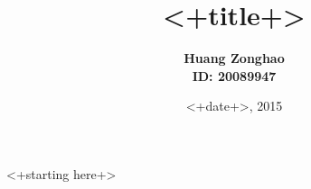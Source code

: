 \documentclass[12pt,a4paper]{article}
\begin{document}
\title{\textbf {<+title+>}}
\author{\textbf{Huang Zonghao}\\
\textbf{ID: 20089947}}
\date{<+date+>, 2015}
\maketitle
<+starting here+>

\end{document}
